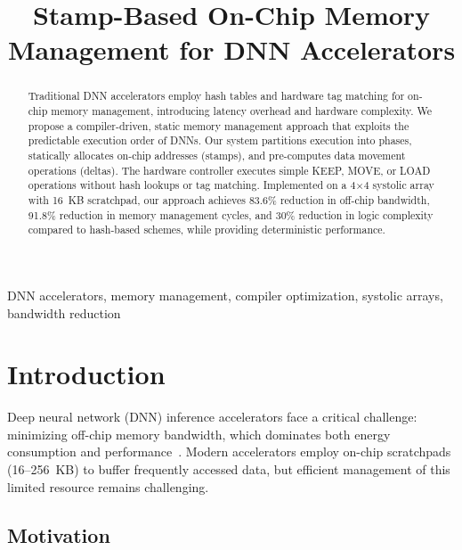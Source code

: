 \documentclass[conference]{IEEEtran}
\begin{document}
\title{Stamp-Based On-Chip Memory Management for DNN Accelerators}

\author{
}

\maketitle

\begin{abstract}
Traditional DNN accelerators employ hash tables and hardware tag matching for on-chip memory management, introducing latency overhead and hardware complexity. We propose a compiler-driven, static memory management approach that exploits the predictable execution order of DNNs. Our system partitions execution into phases, statically allocates on-chip addresses (stamps), and pre-computes data movement operations (deltas). The hardware controller executes simple KEEP, MOVE, or LOAD operations without hash lookups or tag matching. Implemented on a 4$\times$4 systolic array with 16~KB scratchpad, our approach achieves 83.6\% reduction in off-chip bandwidth, 91.8\% reduction in memory management cycles, and 30\% reduction in logic complexity compared to hash-based schemes, while providing deterministic performance.
\end{abstract}

\begin{IEEEkeywords}
DNN accelerators, memory management, compiler optimization, systolic arrays, bandwidth reduction
\end{IEEEkeywords}

\section{Introduction}

Deep neural network (DNN) inference accelerators face a critical challenge: minimizing off-chip memory bandwidth, which dominates both energy consumption and performance~\cite{chen2016eyeriss, chen2019eyerissv2}. Modern accelerators employ on-chip scratchpads (16--256~KB) to buffer frequently accessed data, but efficient management of this limited resource remains challenging.

\subsection{Motivation}
\end{document}
